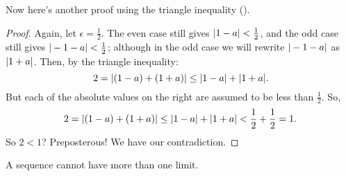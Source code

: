 \begin{example}
\begin{tightfigure}
  \end{tightfigure}

  Now here's another proof using the triangle inequality
  ().

  \begin{proof}
    Again, let $\epsilon = \frac{1}{2}$. The even case still gives
    $| 1 - a | < \frac{1}{2}$, and the odd case still gives
    $| -1 - a | < \frac{1}{2}$; although in the odd case we will
    rewrite $| -1 - a |$ as $| 1 + a |$. Then, by the triangle inequality:
    \[ 2 = | (1 - a) + (1 + a) | \leq | 1 - a | + | 1 + a |. \]
    But each of the absolute values on the right are assumed to be
    less than $\frac{1}{2}$. So,
    \[ 2 = | (1 - a) + (1 + a) | \leq | 1 - a | + | 1 + a | <
    \frac{1}{2} + \frac{1}{2} = 1. \]
    So $2 < 1$? Preposterous! We have our contradiction.
  \end{proof}
\end{example}

\begin{proposition}
  A sequence cannot have more than one limit.
\end{proposition}

